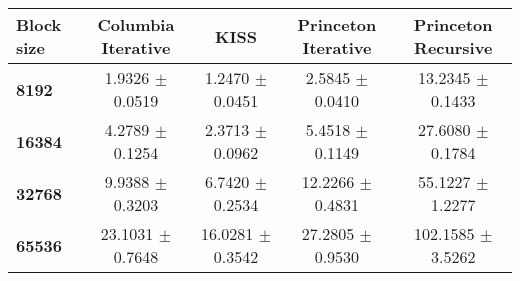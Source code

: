 \begin{tabular}{lcccc}\toprule
\textbf{Block size}  & \textbf{Columbia Iterative} & \textbf{KISS} & \textbf{Princeton Iterative} & \textbf{Princeton Recursive}\\\midrule
\textbf{8192}  & 1.9326 $\pm$ 0.0519 & 1.2470 $\pm$ 0.0451 & 2.5845 $\pm$ 0.0410 & 13.2345 $\pm$ 0.1433\\
\textbf{16384}  & 4.2789 $\pm$ 0.1254 & 2.3713 $\pm$ 0.0962 & 5.4518 $\pm$ 0.1149 & 27.6080 $\pm$ 0.1784\\
\textbf{32768}  & 9.9388 $\pm$ 0.3203 & 6.7420 $\pm$ 0.2534 & 12.2266 $\pm$ 0.4831 & 55.1227 $\pm$ 1.2277\\
\textbf{65536} & 23.1031 $\pm$ 0.7648 & 16.0281 $\pm$ 0.3542 & 27.2805 $\pm$ 0.9530 & 102.1585 $\pm$ 3.5262\\
\bottomrule
\end{tabular}
